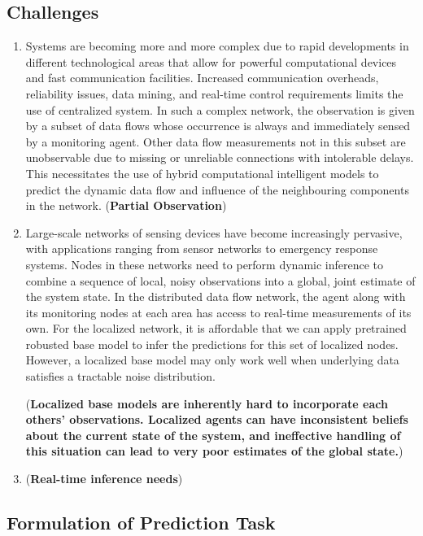 \documentclass{article}
\begin{document}
\subsection{Challenges}
\begin{enumerate}
    \item Systems are becoming more and more complex due to rapid developments
in different technological areas that allow for powerful computational devices and
fast communication facilities. Increased communication overheads, reliability issues, data mining, and real-time control requirements limits the use of centralized system. In such a complex network, the observation is given by a subset of data flows whose occurrence is always and immediately sensed by a monitoring
agent. Other data flow measurements not in this subset are unobservable due to missing or unreliable connections with intolerable delays. This necessitates the use of hybrid computational intelligent models to predict the dynamic data flow and influence of the neighbouring components in the network.  (\textbf{Partial Observation})
    \item Large-scale networks of sensing devices have become increasingly pervasive, with applications ranging from sensor networks to emergency response systems.
    Nodes in these networks need to perform dynamic inference to combine a sequence of local, noisy observations into a global, joint estimate of the system state. 
    In the distributed data flow network, the agent along with its monitoring nodes at each area has access to real-time measurements of its own. For the localized network, it is affordable that we can apply pretrained robusted base model to infer the predictions for this set of localized nodes. However, a localized base model may only work well when underlying data satisfies a tractable noise distribution. 

(\textbf{Localized base models are inherently hard to incorporate each others' observations. Localized agents can have inconsistent beliefs about the current state of the system, and ineffective handling of this situation can lead to very poor estimates of the global state.})
    \item 
(\textbf{Real-time inference needs})
\end{enumerate}

\subsection{Formulation of Prediction Task}
\end{document}
